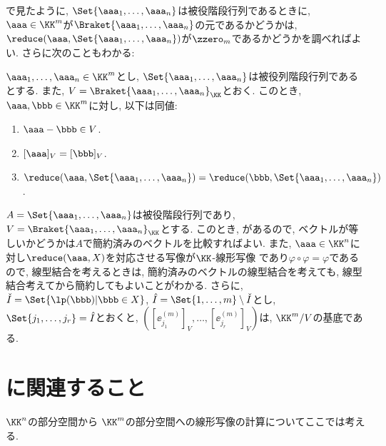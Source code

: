 で見たように,
$\Set{\aaa_1,\ldots,\aaa_n}$は被役階段行列であるときに,
$\aaa\in\KK^m$が$\Braket{\aaa_1,\ldots,\aaa_n}$の元であるかどうかは,
$\reduce(\aaa,\Set{\aaa_1,\ldots,\aaa_n})$が$\zzero_m$であるかどうかを調べればよい.
さらに次のこともわかる:
\begin{prop}
  \label{prop:quotient:reduce}
  $\aaa_1,\ldots,\aaa_n\in\KK^m$とし,
  $\Set{\aaa_1,\ldots,\aaa_n}$は被役列階段行列であるとする.
  また, $V=\Braket{\aaa_1,\ldots,\aaa_n}_{\KK}$とおく.
  このとき,
  $\aaa,\bbb\in \KK^m$に対し,
  以下は同値:
  \begin{enumerate}
  \item $\aaa-\bbb\in V$.
  \item $[\aaa]_V=[\bbb]_V$.
  \item $\reduce(\aaa,\Set{\aaa_1,\ldots,\aaa_n})=\reduce(\bbb,\Set{\aaa_1,\ldots,\aaa_n})$.
  \end{enumerate}
\end{prop}
$A=\Set{\aaa_1,\ldots,\aaa_n}$は被役階段行列であり,
$V=\Braket{\aaa_1,\ldots,\aaa_n}_{\KK}$とする.
このとき,
があるので,
ベクトルが等しいかどうかは$A$で簡約済みのベクトルを比較すればよい.
また,
$\aaa\in\KK^n$に対し$\reduce(\aaa,X)$を対応させる写像が$\KK$-線形写像
であり$\varphi\circ\varphi=\varphi$であるので,
線型結合を考えるときは,
簡約済みのベクトルの線型結合を考えても,
線型結合考えてから簡約してもよいことがわかる.
さらに,
$\check I=\Set{\lp(\bbb)|\bbb\in X}$,
$\hat I=\Set{1,\ldots,m}\setminus\check I$とし,
$\Set{j_1,\ldots,j_r}=\hat I$とおくと,
$([\ee^{(m)}_{j_1}]_V,\ldots,[\ee^{(m)}_{j_r}]_V)$は,
$\KK^m/V$の基底である.



\section{に関連すること}
$\KK^n$の部分空間から
$\KK^m$の部分空間への線形写像の計算についてここでは考える.

